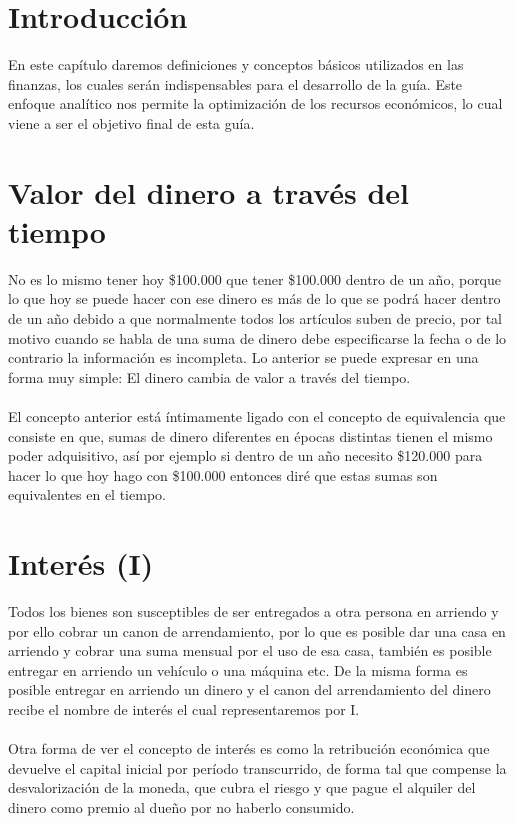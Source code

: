 \section{Introducción}
En este capítulo daremos definiciones y conceptos básicos utilizados en las finanzas, los cuales serán indispensables para el desarrollo de la guía. Este enfoque analítico nos permite la optimización de los recursos económicos, lo cual viene a ser el objetivo final de esta guía.

\section{Valor del dinero a través del tiempo}
No es lo mismo tener hoy \$100.000 que tener \$100.000 dentro de un año, porque lo que hoy se puede hacer con ese dinero es más de lo que se podrá hacer dentro de un año debido a que normalmente todos los artículos suben de precio, por tal motivo cuando se habla de una suma de dinero debe especificarse la fecha o de lo contrario la información es incompleta. Lo anterior se puede expresar en una forma muy simple: El dinero cambia de valor a través del tiempo.
\\\\
El concepto anterior está íntimamente ligado con el concepto de equivalencia que consiste en que, sumas de dinero diferentes en épocas distintas tienen el mismo poder adquisitivo, así por ejemplo si dentro de un año necesito \$120.000 para hacer lo que hoy hago con \$100.000 entonces diré que estas sumas son equivalentes en el tiempo.

\section{Interés (I)}

Todos los bienes son susceptibles de ser entregados a otra persona en arriendo y por ello cobrar un canon de arrendamiento, por lo que es posible dar una casa en arriendo y cobrar una suma mensual por el uso de esa casa, también es posible entregar en arriendo un vehículo o una máquina etc. De la misma forma es posible entregar en arriendo un dinero y el canon del arrendamiento del dinero recibe el nombre de interés el cual representaremos por I.
\\\\
Otra forma de ver el concepto de interés es como la retribución económica que devuelve el capital inicial por período transcurrido, de forma tal que compense la desvalorización de la moneda, que cubra el riesgo y que pague el alquiler del dinero como premio al dueño por no haberlo consumido.

